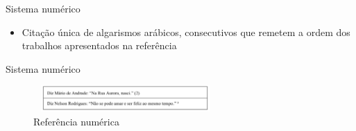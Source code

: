 \begin{frame}	
	\begin{block}{Sistema numérico}	
		\begin{itemize}
			\item Citação única de algarismos arábicos, consecutivos que remetem a ordem dos trabalhos apresentados na referência
		\end{itemize}
	\end{block}
\end{frame}

\begin{frame}	
	\begin{block}{Sistema numérico}	
		 \begin{figure}[!htb]
			\centering	  				
			\includegraphics[height=1cm, width = 7cm]{./pic/numerico.png}
			\caption{Referência numérica \cite{GUIA_SENAC}}
			\label{fig_citacaoreferencianumerica}
		\end{figure}
	\end{block}
\end{frame}